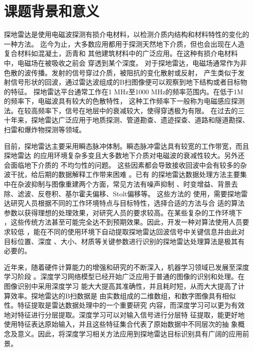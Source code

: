 \thesischapterexordium

\section{课题背景和意义}

探地雷达是使用电磁波探测有损介电材料，以检测介质内结构和材料特性的变化的一种方法。
迄今为止，大多数应用都用于探测天然地下介质，但也会出现在人造复合材料如混凝土，沥青和
其他建筑材料中的广泛应用。在这种有损介电材料中，电磁场在被吸收之前会
穿透到某个深度。
对于探地雷达，电磁场通常作为非色散的波传播。发射的信号穿过介质，被阻抗的变化散射或反射，
产生类似于发射信号形状的回波，通过雷达波组成的B扫图像便可以观察到地下结构或者目标物的特征。
探地雷达平台通常工作在1 MHz至1000 MHz的频率范围内。在低于1M的频率下，电磁波具有较大的色散特性，
这种工作频率下一般称为电磁感应探测法。在较高频率下，信号在地层中的衰减较大，使得穿透极为有限。
在过去的三十年来，探地雷达广泛应用于地质探测、管道勘查、遗迹探查、道路和隧道勘探、
扫雷和爆炸物探测等领域。

目前，探地雷达主要采用瞬态脉冲体制。瞬态脉冲雷达具有较宽的工作带宽，而且探地雷达
的应用环境复杂多变且大多数地下介质对电磁波的衰减性较大。另外还会面临地下介质的
不均匀性的问题。
这些因素都会导致接收回波中会有较多的杂波干扰，给后期的数据解释工作带来困难
。已有
的探地雷达数据处理方法主要集中在杂波抑制与图像重建两个方面，常见方法有噪声抑制
、时变增益、背景去除、滤波、反卷积、基尔霍夫偏移、Stolt偏移等。
这些方法的
使用，需要探地雷达研究人员根据不同的工作环境特点与目标特性，选择合适的方法与合
适的算法参数以获得理想的处理效果，对研究人员的要求较高。在某些复杂的工作环境下
，这些传统方法甚至可能完全达不到预期效果。因此，开发一种对算法使用人员要求较低
，能在不同的使用环境下自动提取探地雷达回波信号中关键信息并由此对目标位置、深度
、大小、材质等关键参数进行识别的探地雷达处理算法是极其有必要的。

近年来，随着硬件计算能力的增强和研究的不断深入，机器学习领域已发展至深度学习阶段
。深度学习网络模型已经开始广泛应用于普通的图像的识别和处理。在图像识别中采用深度学习
能大大提高其准确性，并且耗时短，从而大大提高了计算效率。探地雷达的B扫数据是
由实数组成的二维数组，和数字图像具有相似性。特征提取是雷达数据处理中的一个重要研究
内容，而深度学习可以更为有效地对特征进行分层提取。深度学习可以对输入信号进行分层特
征提取，能更好地使用特征表达原始输入，并且这些特征集合代表了原始数据中不同层次的抽
象概念及意义。因此，将深度学习相关方法应用到探地雷达目标识别具有广阔的应用前景。


